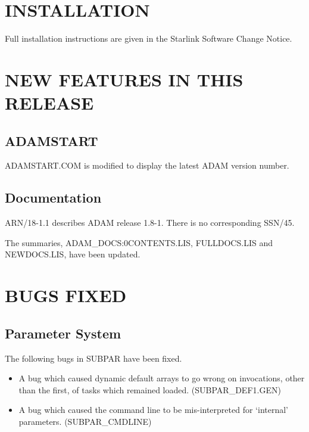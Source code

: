 \section{INSTALLATION}
Full installation instructions are given in the Starlink Software 
Change Notice.

\section{NEW FEATURES IN THIS RELEASE}


\subsection{ADAMSTART}
ADAMSTART.COM is modified to display the latest ADAM version number.

\subsection{Documentation}
ARN/18-1.1 describes ADAM release 1.8-1.
There is no corresponding SSN/45.

The summaries, ADAM\_DOCS:0CONTENTS.LIS, FULLDOCS.LIS and NEWDOCS.LIS, have 
been updated. 

\section{BUGS FIXED}

\subsection{Parameter System}
The following bugs in SUBPAR have been fixed.
\begin{itemize}
\item A bug which caused dynamic default arrays to go wrong on invocations,
other than the first, of tasks which remained loaded.
(SUB\-PAR\_\-DEF1\-.GEN) 
\item A bug which caused the command line to be mis-interpreted for `internal'
parameters.
(SUB\-PAR\_\-CMD\-LINE) 
\end{itemize}


